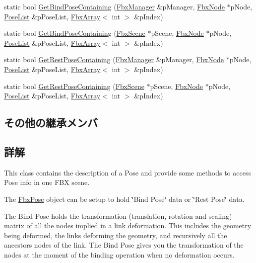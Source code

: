 \begin{DoxyCompactItemize}
\item 
static bool \hyperlink{class_fbx_pose_a0f3a4900ad6a6ccaae87e419f55abff1}{Get\+Bind\+Pose\+Containing} (\hyperlink{class_fbx_manager}{Fbx\+Manager} \&p\+Manager, \hyperlink{class_fbx_node}{Fbx\+Node} $\ast$p\+Node, \hyperlink{fbxpose_8h_ad68863a9c2ab60c2210bb3dff02a680a}{Pose\+List} \&p\+Pose\+List, \hyperlink{class_fbx_array}{Fbx\+Array}$<$ int $>$ \&p\+Index)
\item 
static bool \hyperlink{class_fbx_pose_ad96a702071f681013cc2a69773604cdc}{Get\+Bind\+Pose\+Containing} (\hyperlink{class_fbx_scene}{Fbx\+Scene} $\ast$p\+Scene, \hyperlink{class_fbx_node}{Fbx\+Node} $\ast$p\+Node, \hyperlink{fbxpose_8h_ad68863a9c2ab60c2210bb3dff02a680a}{Pose\+List} \&p\+Pose\+List, \hyperlink{class_fbx_array}{Fbx\+Array}$<$ int $>$ \&p\+Index)
\item 
static bool \hyperlink{class_fbx_pose_aa7280dc3f8c4d448d988c0bc7cf17a67}{Get\+Rest\+Pose\+Containing} (\hyperlink{class_fbx_manager}{Fbx\+Manager} \&p\+Manager, \hyperlink{class_fbx_node}{Fbx\+Node} $\ast$p\+Node, \hyperlink{fbxpose_8h_ad68863a9c2ab60c2210bb3dff02a680a}{Pose\+List} \&p\+Pose\+List, \hyperlink{class_fbx_array}{Fbx\+Array}$<$ int $>$ \&p\+Index)
\item 
static bool \hyperlink{class_fbx_pose_abbab8f2576e5dbfc949d5abed41e85eb}{Get\+Rest\+Pose\+Containing} (\hyperlink{class_fbx_scene}{Fbx\+Scene} $\ast$p\+Scene, \hyperlink{class_fbx_node}{Fbx\+Node} $\ast$p\+Node, \hyperlink{fbxpose_8h_ad68863a9c2ab60c2210bb3dff02a680a}{Pose\+List} \&p\+Pose\+List, \hyperlink{class_fbx_array}{Fbx\+Array}$<$ int $>$ \&p\+Index)
\end{DoxyCompactItemize}
\subsection*{その他の継承メンバ}


\subsection{詳解}
This class contains the description of a Pose and provide some methods to access Pose info in one F\+BX scene.

The \hyperlink{class_fbx_pose}{Fbx\+Pose} object can be setup to hold \char`\"{}\+Bind Pose\char`\"{} data or \char`\"{}\+Rest Pose\char`\"{} data.

The Bind Pose holds the transformation (translation, rotation and scaling) matrix of all the nodes implied in a link deformation. This includes the geometry being deformed, the links deforming the geometry, and recursively all the ancestors nodes of the link. The Bind Pose gives you the transformation of the nodes at the moment of the binding operation when no deformation occurs.

